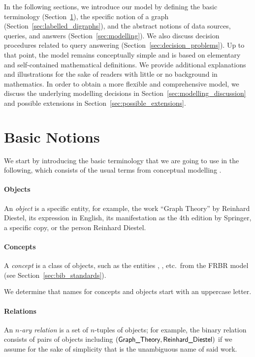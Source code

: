 In the following sections, we introduce our model
by defining 
the basic terminology (Section~\ref{sec:terminology}),
the specific notion of a graph (Section~\ref{sec:labelled_digraphs}),
and the abstract notions of data sources, queries, and answers
(Section~\ref{sec:modelling}).
We also discuss decision procedures related to query answering (Section~\ref{sec:decision_problems}).
Up to that point, the model remains conceptually simple
and is based on elementary and self-contained mathematical definitions.
We provide additional explanations and illustrations
for the sake of readers with little or no background in mathematics.
In order to obtain a more flexible and comprehensive model, we discuss the underlying modelling decisions
in Section~\ref{sec:modelling_discussion} and possible extensions in Section~\ref{sec:possible_extensions}.


\section{Basic Notions}
\label{sec:terminology}

We start by introducing the basic terminology that we are going to use
in the following, which consists of the usual terms from conceptual
modelling \autocite{Brodie1984}.

\paragraph{Objects}
An \emph{object} is a specific entity,
for example, the work \enquote{Graph Theory} by Reinhard Diestel,
its expression in English,
its manifestation as the 4th edition by Springer,
a specific copy, or the person Reinhard Diestel.

\paragraph{Concepts}
A \emph{concept} is a class of objects,
such as the entities , , etc.\
from the \gls{FRBR} model (see Section~\ref{sec:bib_standards}).

We determine that names for concepts and objects start with an uppercase letter.

\paragraph{Relations}
An \emph{$n$-ary relation} is a set of $n$-tuples of objects;
for example, the binary relation 
consists of pairs of objects including $(,\term{Reinhard\_Diestel})$
if we assume for the sake of simplicity that \term{Graph\_Theory}
is the unambiguous name of said work. 

